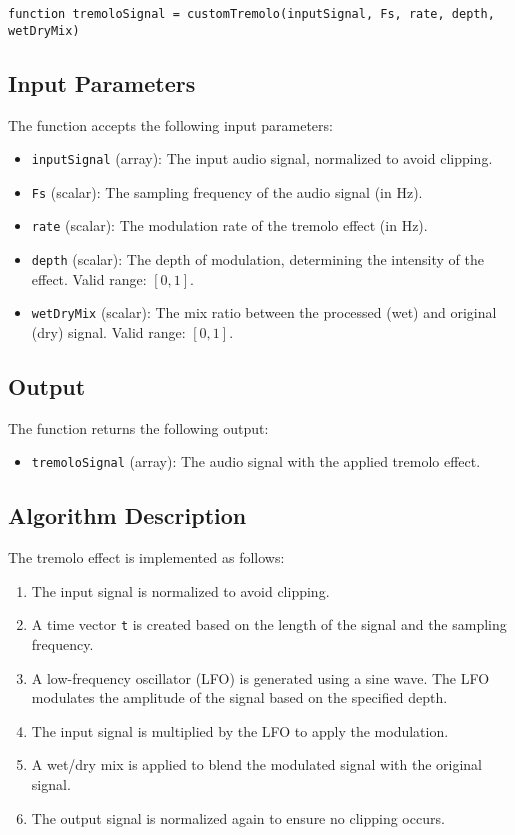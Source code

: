 \documentclass{article}
\begin{document}
\begin{verbatim}
function tremoloSignal = customTremolo(inputSignal, Fs, rate, depth, wetDryMix)
\end{verbatim}

\subsection{Input Parameters}
The function accepts the following input parameters:
\begin{itemize}
    \item \texttt{inputSignal} (array): The input audio signal, normalized to avoid clipping.
    \item \texttt{Fs} (scalar): The sampling frequency of the audio signal (in Hz).
    \item \texttt{rate} (scalar): The modulation rate of the tremolo effect (in Hz).
    \item \texttt{depth} (scalar): The depth of modulation, determining the intensity of the effect. Valid range: $[0, 1]$.
    \item \texttt{wetDryMix} (scalar): The mix ratio between the processed (wet) and original (dry) signal. Valid range: $[0, 1]$.
\end{itemize}

\subsection{Output}
The function returns the following output:
\begin{itemize}
    \item \texttt{tremoloSignal} (array): The audio signal with the applied tremolo effect.
\end{itemize}

\subsection{Algorithm Description}
The tremolo effect is implemented as follows:
\begin{enumerate}
    \item The input signal is normalized to avoid clipping.
    \item A time vector \texttt{t} is created based on the length of the signal and the sampling frequency.
    \item A low-frequency oscillator (LFO) is generated using a sine wave. The LFO modulates the amplitude of the signal based on the specified depth.
    \item The input signal is multiplied by the LFO to apply the modulation.
    \item A wet/dry mix is applied to blend the modulated signal with the original signal.
    \item The output signal is normalized again to ensure no clipping occurs.
\end{enumerate}
\end{document}
